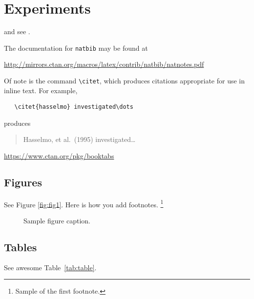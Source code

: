 \documentclass{article}
\begin{document}
\section{Experiments}
\label{sec:others}
\lipsum[8] \cite{kour2014real,kour2014fast} and see \cite{hadash2018estimate}.

The documentation for \verb+natbib+ may be found at
\begin{center}
  \url{http://mirrors.ctan.org/macros/latex/contrib/natbib/natnotes.pdf}
\end{center}
Of note is the command \verb+\citet+, which produces citations
appropriate for use in inline text.  For example,
\begin{verbatim}
   \citet{hasselmo} investigated\dots
\end{verbatim}
produces
\begin{quote}
  Hasselmo, et al.\ (1995) investigated\dots
\end{quote}

\begin{center}
  \url{https://www.ctan.org/pkg/booktabs}
\end{center}


\subsection{Figures}
\lipsum[10] 
See Figure \ref{fig:fig1}. Here is how you add footnotes. \footnote{Sample of the first footnote.}
\lipsum[11] 

\begin{figure}
  \centering
  \fbox{\rule[-.5cm]{4cm}{4cm} \rule[-.5cm]{4cm}{0cm}}
  \caption{Sample figure caption.}
  \label{fig:SimpleFFN.png}
\end{figure}

\subsection{Tables}
\lipsum[12]
See awesome Table~\ref{tab:table}.

\end{document}
